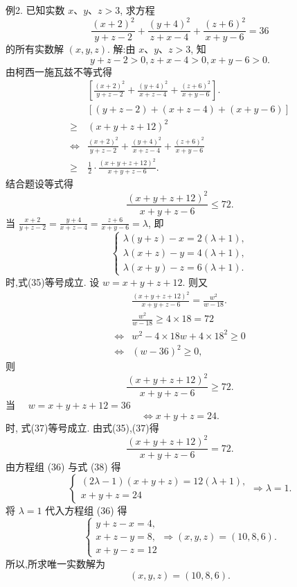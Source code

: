 例2. 已知实数 $x 、 y 、 z>3$, 求方程
$$
\frac{(x+2)^2}{y+z-2}+\frac{(y+4)^2}{z+x-4}+\frac{(z+6)^2}{x+y-6}=36
$$
的所有实数解 $(x, y, z)$.
解:由 $x 、 y 、 z>3$, 知
$$
y+z-2>0, z+x-4>0, x+y-6>0 .
$$
由柯西一施瓦兹不等式得
$$
\begin{aligned}
& {\left[\frac{(x+2)^2}{y+z-2}+\frac{(y+4)^2}{x+z-4}+\frac{(z+6)^2}{x+y-6}\right] . } \\
& {[(y+z-2)+(x+z-4)+(x+y-6)] } \\
\geqslant & (x+y+z+12)^2 \\
\Leftrightarrow & \frac{(x+2)^2}{y+z-2}+\frac{(y+4)^2}{x+z-4}+\frac{(z+6)^2}{x+y-6} \\
\geqslant & \frac{1}{2} \cdot \frac{(x+y+z+12)^2}{x+y+z-6} .
\end{aligned}
$$
结合题设等式得
$$
\frac{(x+y+z+12)^2}{x+y+z-6} \leqslant 72 . \label{(35)}
$$
当 $\frac{x+2}{y+z-2}=\frac{y+4}{x+z-4}=\frac{z+6}{x+y-6}=\lambda$, 即
$$
\left\{\begin{array}{l}
\lambda(y+z)-x=2(\lambda+1), \\
\lambda(x+z)-y=4(\lambda+1), \\
\lambda(x+y)-z=6(\lambda+1) .
\end{array}\right. \label{(36)}
$$
时,式(35)等号成立.
设 $w=x+y+z+12$. 则又
$$
\begin{aligned}
& \frac{(x+y+z+12)^2}{x+y+z-6}=\frac{w^2}{w-18} . \\
& \frac{w^2}{w-18} \geqslant 4 \times 18=72 \\
\Leftrightarrow & w^2-4 \times 18 w+4 \times 18^2 \geqslant 0 \\
\Leftrightarrow & (w-36)^2 \geqslant 0,
\end{aligned}
$$
则
$$
\frac{(x+y+z+12)^2}{x+y+z-6} \geqslant 72 . \label{(37)}
$$
当 $\quad w=x+y+z+12=36$
$$
\Leftrightarrow x+y+z=24 . \label{(38)}
$$
时, 式(37)等号成立.
由式(35),(37)得
$$
\frac{(x+y+z+12)^2}{x+y+z-6}=72 .
$$
由方程组 (36) 与式 (38) 得
$$
\left\{\begin{array}{l}
(2 \lambda-1)(x+y+z)=12(\lambda+1), \\
x+y+z=24
\end{array} \Rightarrow \lambda=1 .\right.
$$
将 $\lambda=1$ 代入方程组 (36) 得
$$
\left\{\begin{array}{l}
y+z-x=4, \\
x+z-y=8, \\
x+y-z=12
\end{array} \Rightarrow(x, y, z)=(10,8,6) .\right.
$$
所以,所求唯一实数解为
$$
(x, y, z)=(10,8,6) .
$$



